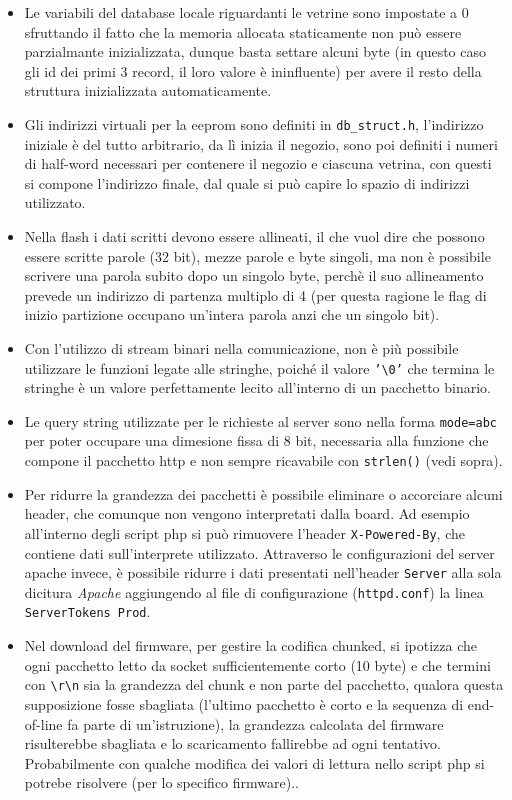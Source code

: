 \begin{itemize}
\item Le variabili del database locale riguardanti le vetrine sono impostate a 0 sfruttando il fatto che la memoria allocata staticamente non pu\`o essere parzialmante inizializzata, dunque basta settare alcuni byte (in questo caso gli id dei primi 3 record, il loro valore \`e ininfluente) per avere il resto della struttura inizializzata automaticamente.
\item Gli indirizzi virtuali per la eeprom sono definiti in \texttt{db\_struct.h}, l'indirizzo iniziale \`e del tutto arbitrario, da lì inizia il negozio, sono poi definiti i numeri di half-word necessari per contenere il negozio e ciascuna vetrina, con questi si compone l'indirizzo finale, dal quale si pu\`o capire lo spazio di indirizzi utilizzato.
\item Nella flash i dati scritti devono essere allineati, il che vuol dire che possono essere scritte parole (32 bit), mezze parole e byte singoli, ma non è possibile scrivere una parola subito dopo un singolo byte, perch\`e il suo allineamento prevede un indirizzo di partenza multiplo di 4 (per questa ragione le flag di inizio partizione occupano un'intera parola anzi che un singolo bit).
\item Con l'utilizzo di stream binari nella comunicazione, non \`e pi\`u possibile utilizzare le funzioni legate alle stringhe, poich\'e il valore \texttt{'\textbackslash 0'} che termina le stringhe \`e un valore perfettamente lecito all'interno di un pacchetto binario.
\item Le query string utilizzate per le richieste al server sono nella forma \texttt{mode=abc} per poter occupare una dimesione fissa di 8 bit, necessaria alla funzione che compone il pacchetto http e non sempre ricavabile con \texttt{strlen()} (vedi sopra).
\item Per ridurre la grandezza dei pacchetti \`e possibile eliminare o accorciare alcuni header, che comunque non vengono interpretati dalla board. Ad esempio all'interno degli script php si pu\`o rimuovere l'header \texttt{X-Powered-By}, che contiene dati sull'interprete utilizzato. Attraverso le configurazioni del server apache invece, \`e possibile ridurre i dati presentati nell'header \texttt{Server} alla sola dicitura \textit{Apache} aggiungendo al file di configurazione (\texttt{httpd.conf}) la linea \texttt{ServerTokens Prod}.
\item Nel download del firmware, per gestire la codifica chunked, si ipotizza che ogni pacchetto letto da socket sufficientemente corto (10 byte) e che termini con \texttt{\textbackslash{r}\textbackslash{n}} sia la grandezza del chunk e non parte del pacchetto, qualora questa supposizione fosse sbagliata (l'ultimo pacchetto \`e corto e la sequenza di end-of-line fa parte di un'istruzione), la grandezza calcolata del firmware risulterebbe sbagliata e lo scaricamento fallirebbe ad ogni tentativo. Probabilmente con qualche modifica dei valori di lettura nello script php si potrebe risolvere (per lo specifico firmware)..

\end{itemize}
